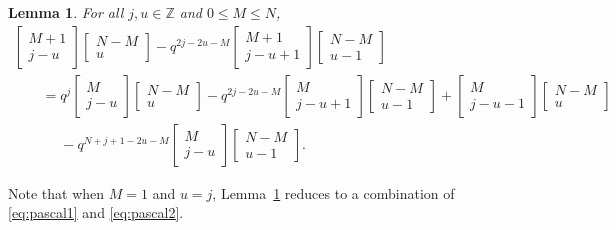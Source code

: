 \documentclass[11pt]{article}
\numberwithin{equation}{section}
\newtheorem{Lemma}[Theorem]{Lemma}
\newcommand{\field}[1]{\mathbb{#1}}
\newcommand{\Z}{\field{Z}}
\begin{document}
\begin{Lemma}
\label{lem:tech2}
For all $j,u \in \Z$ and $0\leq M\leq N$,
\begin{gather*}
\begin{bmatrix}
M+1\\
j-u
\end{bmatrix} \begin{bmatrix}
N-M\\
u
\end{bmatrix}-q^{2j-2u-M}\begin{bmatrix}
M+1\\
j-u+1
\end{bmatrix} \begin{bmatrix}
N-M\\
u-1
\end{bmatrix}\\
\qquad
=q^j \begin{bmatrix}
M\\
j-u
\end{bmatrix} \begin{bmatrix}
N-M\\
u
\end{bmatrix}
- q^{2j-2u-M}\begin{bmatrix}
M\\
j-u+1
\end{bmatrix} \begin{bmatrix}
N-M\\
u-1
\end{bmatrix}+\begin{bmatrix}
M\\
j-u-1
\end{bmatrix} \begin{bmatrix}
N-M\\
u
\end{bmatrix}\\
\phantom{\qquad=}{}- q^{N+j+1-2u-M} \begin{bmatrix}
M\\
j-u
\end{bmatrix} \begin{bmatrix}
N-M\\
u-1
\end{bmatrix}.
\end{gather*}
\end{Lemma}

Note that when $M=1$ and $u=j$, Lemma~\ref{lem:tech2} reduces to a combination of \eqref{eq:pascal1} and \eqref{eq:pascal2}.
\end{document}
